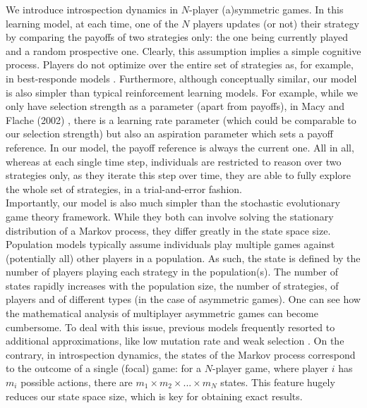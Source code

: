 \documentclass[11pt]{article}
\theoremstyle{plainCl1}
\theoremstyle{plainCl2}
\begin{document}
We introduce introspection dynamics in $N$-player (a)symmetric games. In this learning model, at each time, one of the $N$ players updates (or not) their strategy by comparing the payoffs of two strategies only: the one being currently played and a random prospective one. Clearly, this assumption implies a simple cognitive process. Players do not optimize over the entire set of strategies as, for example, in best-responde models \cite{Gaunersdorfer:GEB:1995, Hofbauer:GEB:2005}. Furthermore, although conceptually similar, our model is also simpler than typical reinforcement learning models. For example, while we only have selection strength as a parameter (apart from payoffs), in Macy and Flache (2002) \cite{Macy:PNAS:2002}, there is a learning rate parameter (which could be comparable to our selection strength) but also an aspiration parameter which sets a payoff reference. In our model, the payoff reference is always the current one. All in all, whereas at each single time step, individuals are restricted to reason over two strategies only, as they iterate this step over time, they are able to fully explore the whole set of strategies, in a trial-and-error fashion. \\

\noindent Importantly, our model is also much simpler than the stochastic evolutionary game theory framework. While they both can involve solving the stationary distribution of a Markov process, they differ greatly in the state space size. Population models typically assume individuals play multiple games against (potentially all) other players in a population. As such, the state is defined by the number of players playing each strategy in the population(s). The number of states rapidly increases with the population size, the number of strategies, of players and of different types (in the case of asymmetric games). One can see how the mathematical analysis of multiplayer asymmetric games can become cumbersome. To deal with this issue, previous models frequently resorted to additional approximations, like low mutation rate \cite{Fudenberg:JET:2006, Veller:JET:2016} and weak selection \cite{Wild:JTB:2007}. %
On the contrary, in introspection dynamics, the states of the Markov process correspond to the outcome of a single (focal) game: for a $N$-player game, where player $i$ has $m_i$ possible actions, there are $m_1 \times m_2 \times ... \times m_N$ states. This feature hugely reduces our state space size, which is key for obtaining exact results.  \\
\end{document}
